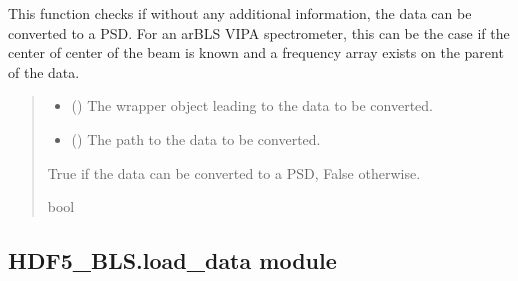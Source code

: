 \documentclass[letterpaper,10pt,english]{sphinxmanual}
\begin{document}
\begin{fulllineitems}
\label{\detokenize{source/HDF5_BLS:HDF5_BLS.conversion_PSD.check_conversion_ar_BLS_VIPA}}
\pysigstartsignatures
\pysiglinewithargsret
{}
{\sphinxparamcomma {}}
{}
\pysigstopsignatures
\sphinxAtStartPar
This function checks if without any additional information, the data can be converted to a PSD. For an ar\sphinxhyphen{}BLS VIPA spectrometer, this can be the case if the center of center of the beam is known and a frequency array exists on the parent of the data.
\begin{quote}\begin{description}
\begin{itemize}
\item {} 
\sphinxAtStartPar
{} ({\hyperref[\detokenize{source/HDF5_BLS:HDF5_BLS.wrapper.Wrapper}]{}}) \textendash{} The wrapper object leading to the data to be converted.

\item {} 
\sphinxAtStartPar
{} () \textendash{} The path to the data to be converted.

\end{itemize}

\sphinxAtStartPar
True if the data can be converted to a PSD, False otherwise.

\sphinxAtStartPar
bool

\end{description}\end{quote}

\end{fulllineitems}



\subsection{HDF5\_BLS.load\_data module}
\label{\detokenize{source/HDF5_BLS:module-HDF5_BLS.load_data}}\label{\detokenize{source/HDF5_BLS:hdf5-bls-load-data-module}}
\end{document}
